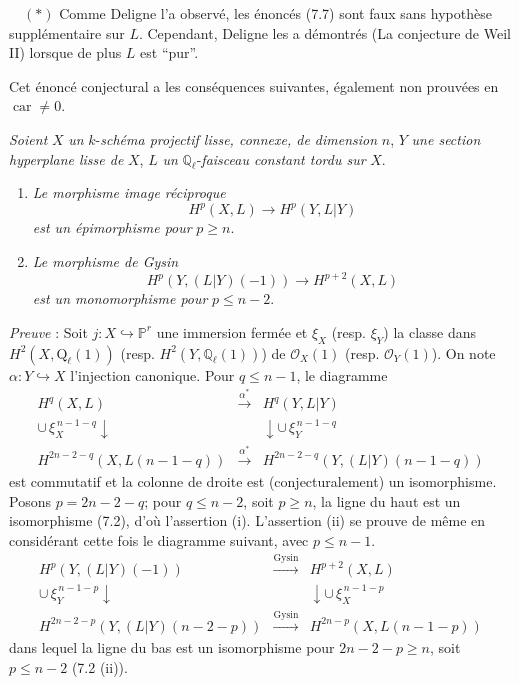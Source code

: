 \documentclass[11pt]{article}
\begin{document}
\(\quad (*)\) Comme Deligne l'a observé, les énoncés (7.7) sont faux sans hypothèse supplémentaire sur $L$. Cependant, Deligne les a démontrés (La conjecture de Weil II) lorsque de plus $L$ est ``pur''.

Cet
énoncé conjectural a les conséquences suivantes, également non prouvées en $\operatorname{car}\ne0$.

\emph{Soient} $X$ \emph{un} $k$-\emph{schéma projectif lisse, connexe, de dimension} $n$, $Y$ \emph{une section hyperplane lisse de} $X$, $L$ \emph{un} $\mathbb Q_\ell$-\emph{faisceau constant tordu sur} $X$.
\begin{enumerate}[label=(\roman*)]
\item \emph{Le morphisme image réciproque}
\[
H^p(X,L)\to H^p(Y,L|Y)
\]
\emph{est un épimorphisme pour} $p\ge n$.
\item \emph{Le morphisme de Gysin}
\[
H^p(Y,(L|Y)(-1))\to H^{p+2}(X,L)
\]
\emph{est un monomorphisme pour} $p\le n-2$.
\end{enumerate}

\emph{Preuve} : Soit $j:X\hookrightarrow\mathbb P^r$ une immersion fermée et $\xi_X$ (resp. $\xi_Y$) la classe dans $H^2(X,\mathrm{Q}_\ell(1))$ (resp. $H^2(Y,\mathbb Q_\ell(1))$) de $\mathcal O_X(1)$ (resp. $\mathcal O_Y(1)$). On note $\alpha:Y\hookrightarrow X$ l'injection canonique. Pour $q\le n-1$, le diagramme
\[
\begin{array}{ccc}
H^q(X,L)&\xrightarrow{\alpha^*}&H^q(Y,L|Y)\\
\cup\,\xi_X^{\,n-1-q}\downarrow&&\downarrow\cup\,\xi_Y^{\,n-1-q}\\
H^{2n-2-q}(X,L(n-1-q))&\xrightarrow{\alpha^*}&
H^{2n-2-q}(Y,(L|Y)(n-1-q))
\end{array}
\]
est commutatif et la colonne de droite est (conjecturalement) un isomorphisme. Posons $p=2n-2-q$; pour $q\le n-2$, soit $p\ge n$, la ligne du haut est un isomorphisme (7.2), d'où l'assertion (i). L'assertion (ii) se prouve de même en considérant cette fois le diagramme suivant, avec $p\le n-1$.
\[
\begin{array}{ccc}
H^p(Y,(L|Y)(-1))&
\xrightarrow{\mathrm{Gysin}}&H^{p+2}(X,L)\\
\cup\,\xi_Y^{\,n-1-p}\downarrow&&\downarrow\cup\,\xi_X^{\,n-1-p}\\
H^{2n-2-p}(Y,(L|Y)(n-2-p))&\xrightarrow{\mathrm{Gysin}}&
H^{2n-p}(X,L(n-1-p))
\end{array}
\]
dans lequel la ligne du bas est un isomorphisme pour $2n-2-p\ge n$, soit $p\le n-2$ (7.2 (ii)).
\end{document}
